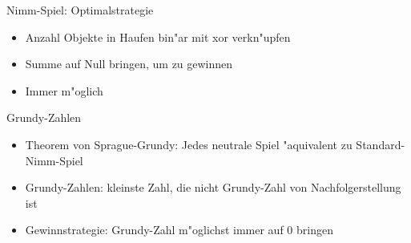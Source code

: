 \documentclass[18pt]{beamer}
\begin{document}
\begin{frame}{Nimm-Spiel: Optimalstrategie}
\begin{itemize}
\item Anzahl Objekte in Haufen bin"ar mit xor verkn"upfen
\item Summe auf Null bringen, um zu gewinnen
\item Immer m"oglich
\end{itemize}
\end{frame}

\begin{frame}{Grundy-Zahlen}
\begin{itemize}
\item Theorem von Sprague-Grundy: Jedes neutrale Spiel "aquivalent zu Standard-Nimm-Spiel
\item Grundy-Zahlen: kleinste Zahl, die nicht Grundy-Zahl von Nachfolgerstellung ist
\item Gewinnstrategie: Grundy-Zahl m"oglichst immer auf 0 bringen
\end{itemize}
\end{frame}
\end{document}
